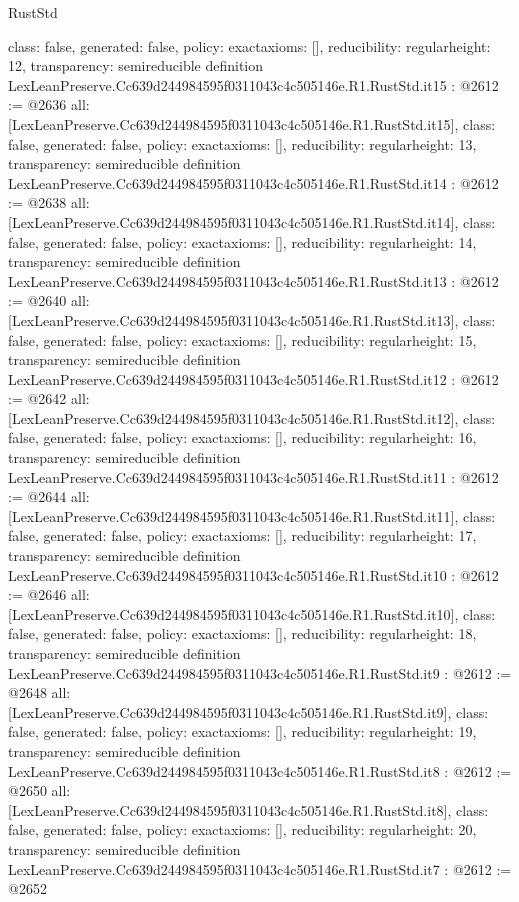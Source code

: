 \begin{lexlean}{RustStd}
\begin{coremodule}
{  class: false,
  generated: false,
  policy: exact{axioms: []},
  reducibility: regular{height: 12},
  transparency: semireducible
}
definition LexLeanPreserve.Cc639d244984595f0311043c4c505146e.R1.RustStd.it15 : @2612 := @2636 {
  all: [LexLeanPreserve.Cc639d244984595f0311043c4c505146e.R1.RustStd.it15],
  class: false,
  generated: false,
  policy: exact{axioms: []},
  reducibility: regular{height: 13},
  transparency: semireducible
}
definition LexLeanPreserve.Cc639d244984595f0311043c4c505146e.R1.RustStd.it14 : @2612 := @2638 {
  all: [LexLeanPreserve.Cc639d244984595f0311043c4c505146e.R1.RustStd.it14],
  class: false,
  generated: false,
  policy: exact{axioms: []},
  reducibility: regular{height: 14},
  transparency: semireducible
}
definition LexLeanPreserve.Cc639d244984595f0311043c4c505146e.R1.RustStd.it13 : @2612 := @2640 {
  all: [LexLeanPreserve.Cc639d244984595f0311043c4c505146e.R1.RustStd.it13],
  class: false,
  generated: false,
  policy: exact{axioms: []},
  reducibility: regular{height: 15},
  transparency: semireducible
}
definition LexLeanPreserve.Cc639d244984595f0311043c4c505146e.R1.RustStd.it12 : @2612 := @2642 {
  all: [LexLeanPreserve.Cc639d244984595f0311043c4c505146e.R1.RustStd.it12],
  class: false,
  generated: false,
  policy: exact{axioms: []},
  reducibility: regular{height: 16},
  transparency: semireducible
}
definition LexLeanPreserve.Cc639d244984595f0311043c4c505146e.R1.RustStd.it11 : @2612 := @2644 {
  all: [LexLeanPreserve.Cc639d244984595f0311043c4c505146e.R1.RustStd.it11],
  class: false,
  generated: false,
  policy: exact{axioms: []},
  reducibility: regular{height: 17},
  transparency: semireducible
}
definition LexLeanPreserve.Cc639d244984595f0311043c4c505146e.R1.RustStd.it10 : @2612 := @2646 {
  all: [LexLeanPreserve.Cc639d244984595f0311043c4c505146e.R1.RustStd.it10],
  class: false,
  generated: false,
  policy: exact{axioms: []},
  reducibility: regular{height: 18},
  transparency: semireducible
}
definition LexLeanPreserve.Cc639d244984595f0311043c4c505146e.R1.RustStd.it9 : @2612 := @2648 {
  all: [LexLeanPreserve.Cc639d244984595f0311043c4c505146e.R1.RustStd.it9],
  class: false,
  generated: false,
  policy: exact{axioms: []},
  reducibility: regular{height: 19},
  transparency: semireducible
}
definition LexLeanPreserve.Cc639d244984595f0311043c4c505146e.R1.RustStd.it8 : @2612 := @2650 {
  all: [LexLeanPreserve.Cc639d244984595f0311043c4c505146e.R1.RustStd.it8],
  class: false,
  generated: false,
  policy: exact{axioms: []},
  reducibility: regular{height: 20},
  transparency: semireducible
}
definition LexLeanPreserve.Cc639d244984595f0311043c4c505146e.R1.RustStd.it7 : @2612 := @2652 {
}
\end{coremodule}
\end{lexlean}
